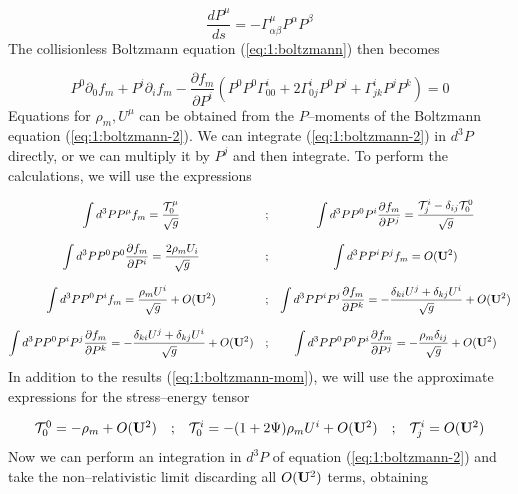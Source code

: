 \begin{equation}
\label{eq:1:geodesic}
\frac{dP^\mu}{ds} = -\Gamma^\mu_{\alpha\beta}P^\alpha P^\beta
\end{equation}
%
The collisionless Boltzmann equation (\ref{eq:1:boltzmann}) then becomes

\begin{equation}
\label{eq:1:boltzmann-2}
P^0\partial_0 f_m + P^i\partial_i f_m - \frac{\partial f_m}{\partial P^i}\left(P^0P^0\Gamma_{00}^i + 2\Gamma_{0j}^iP^0P^j + \Gamma_{jk}^i P^jP^k \right) = 0
\end{equation}
%
Equations for $\rho_m,U^\mu$ can be obtained from the $P$--moments of the Boltzmann equation (\ref{eq:1:boltzmann-2}). We can integrate (\ref{eq:1:boltzmann-2}) in $d^3P$ directly, or we can multiply it by $P^j$ and then integrate. To perform the calculations, we will use the expressions

\begin{equation}
\label{eq:1:boltzmann-mom}
\begin{matrix}
\displaystyle \int d^3P P^\mu f_m = \frac{\mathcal{T}^\mu_0}{\sqrt{g}} & ; & \displaystyle \int d^3P P^0 P^i \frac{\partial f_m}{\partial P^j} = \frac{\mathcal{T}^i_j-\delta_{ij}\mathcal{T}^0_0}{\sqrt{g}} \\ \\
\displaystyle \int d^3P P^0P^0 \frac{\partial f_m}{\partial P^i} = \frac{2\rho_m U_i}{\sqrt{g}} & ; & \displaystyle \int d^3P P^iP^j f_m =  O(\mathbf{U}^2) \\ \\ 
\displaystyle \int d^3P P^0P^i f_m = \frac{\rho_mU^i}{\sqrt{g}} + O(\mathbf{U}^2) & ; & \displaystyle \int d^3P P^iP^j \frac{\partial f_m}{\partial P^k} = -\frac{\delta_{ki}U^j + \delta_{kj}U^i}{\sqrt{g}} + O(\mathbf{U}^2)  \\ \\
\displaystyle \int d^3P P^0P^iP^j \frac{\partial f_m}{\partial P^k} = -\frac{\delta_{ki}U^j + \delta_{kj}U^i}{\sqrt{g}} + O(\mathbf{U}^2) & ; & \displaystyle \int d^3P P^0P^0P^i \frac{\partial f_m}{\partial P^j} = -\frac{\rho_m\delta_{ij}}{\sqrt{g}} + O(\mathbf{U}^2)
\end{matrix}
\end{equation}
%
In addition to the results (\ref{eq:1:boltzmann-mom}), we will use the approximate expressions for the stress--energy tensor 

\begin{equation}
\label{eq:1:stress-energy-nr}
\begin{matrix}
\mathcal{T}^0_0 = -\rho_m + O(\mathbf{U}^2) & ; & \mathcal{T}^i_0 = -(1+2\Psi)\rho_m U^i + O(\mathbf{U}^2)  & ; & \mathcal{T}^i_j = O(\mathbf{U}^2)
\end{matrix}
\end{equation}
%
Now we can perform an integration in $d^3P$ of equation (\ref{eq:1:boltzmann-2}) and take the non--relativistic limit discarding all $O(\mathbf{U}^2)$ terms, obtaining

